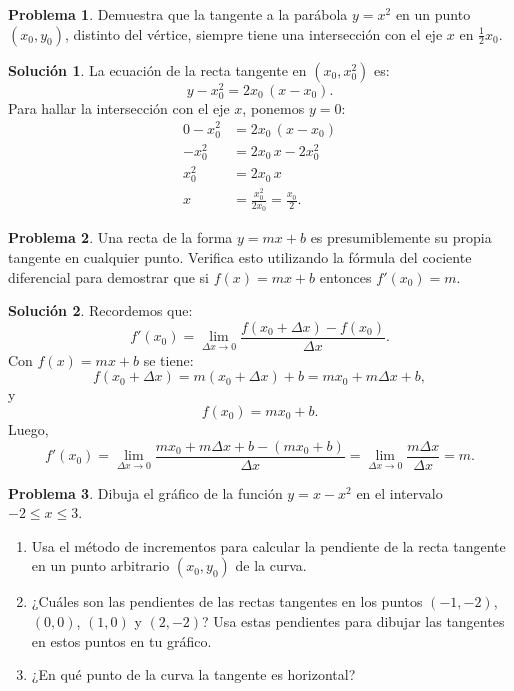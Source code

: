 \documentclass{article}
\theoremstyle{definition}
\newtheorem{problem}{Problema}
\newtheorem*{solution}{Solución}
\begin{document}
\bigskip

\begin{problem}
Demuestra que la tangente a la parábola \( y = x^2 \) en un punto \((x_0,y_0)\), distinto del vértice, siempre tiene una intersección con el eje \( x \) en \(\frac{1}{2}x_0\).
\end{problem}

\begin{solution}
La ecuación de la recta tangente en \((x_0,x_0^2)\) es:
\[
y-x_0^2=2x_0\,(x-x_0).
\]
Para hallar la intersección con el eje \( x \), ponemos \( y=0 \):
\begin{align*}
0 - x_0^2 &= 2x_0\,(x-x_0)\\
-x_0^2 &= 2x_0\,x - 2x_0^2\\
x_0^2 &= 2x_0\,x\\
x &= \frac{x_0^2}{2x_0} = \frac{x_0}{2}.
\end{align*}
\end{solution}

\bigskip

\begin{problem}
Una recta de la forma \( y = mx + b \) es presumiblemente su propia tangente en cualquier punto. Verifica esto utilizando la fórmula del cociente diferencial para demostrar que si \( f(x) = mx + b \) entonces \( f'(x_0) = m \).
\end{problem}

\begin{solution}
Recordemos que:
\[
f'(x_0)=\lim_{\Delta x\to 0}\frac{f(x_0+\Delta x)-f(x_0)}{\Delta x}.
\]
Con \( f(x)=mx+b \) se tiene:
\[
f(x_0+\Delta x)=m(x_0+\Delta x)+b = mx_0 + m\Delta x + b,
\]
y
\[
f(x_0)=mx_0+b.
\]
Luego,
\[
f'(x_0)=\lim_{\Delta x\to 0}\frac{mx_0+m\Delta x+b-(mx_0+b)}{\Delta x}=\lim_{\Delta x\to 0}\frac{m\Delta x}{\Delta x}=m.
\]
\end{solution}

\bigskip

\begin{problem}
Dibuja el gráfico de la función \( y = x - x^2 \) en el intervalo \( -2 \leq x \leq 3 \).
\begin{enumerate}
    \item Usa el método de incrementos para calcular la pendiente de la recta tangente en un punto arbitrario \((x_0, y_0)\) de la curva.
    \item ¿Cuáles son las pendientes de las rectas tangentes en los puntos \((-1,-2)\), \((0,0)\), \((1,0)\) y \((2,-2)\)? Usa estas pendientes para dibujar las tangentes en estos puntos en tu gráfico.
    \item ¿En qué punto de la curva la tangente es horizontal?
\end{enumerate}
\end{problem}
\end{document}
